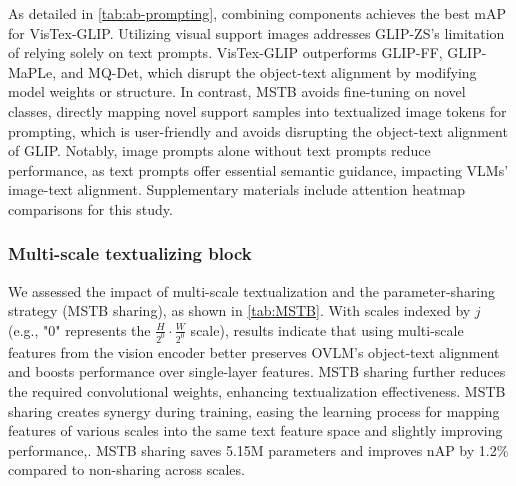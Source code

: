 \documentclass[10pt,twocolumn,letterpaper]{article}
\begin{document}
As detailed in \cref{tab:ab-prompting}, combining components achieves the best mAP for VisTex-GLIP. Utilizing visual support images addresses GLIP-ZS's limitation of relying solely on text prompts. VisTex-GLIP outperforms GLIP-FF, GLIP-MaPLe, and MQ-Det, which disrupt the object-text alignment by modifying model weights or structure. In contrast, MSTB avoids fine-tuning on novel classes, directly mapping novel support samples into textualized image tokens for prompting, which is user-friendly and avoids disrupting the object-text alignment of GLIP. Notably, image prompts alone without text prompts reduce performance, as text prompts offer essential semantic guidance, impacting VLMs’ image-text alignment. Supplementary materials include attention heatmap comparisons for this study. %

\subsubsection{Multi-scale textualizing block}
We assessed the impact of multi-scale textualization and the parameter-sharing strategy (MSTB sharing), as shown in \cref{tab:MSTB}. With scales indexed by $j$ (e.g., "0" represents the $ \frac{H}{2^0} \cdot \frac{W}{2^0} $ scale), results indicate that using multi-scale features from the vision encoder better preserves OVLM's object-text alignment and boosts performance over single-layer features. MSTB sharing further reduces the required convolutional weights, enhancing textualization effectiveness. MSTB sharing creates synergy during training, easing the learning process for mapping features of various scales into the same text feature space and slightly improving performance,. MSTB sharing saves 5.15M parameters and improves nAP by 1.2\% compared to non-sharing across scales.



\end{document}
